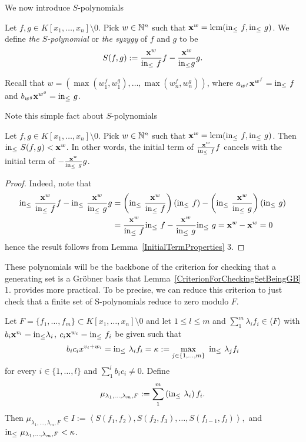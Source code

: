 We now introduce $S$-polynomials
\begin{definition}
    Let $f,g\in K[x_1,\dots,x_n]\setminus 0$. Pick $w\in \mathbb{N}^n$ such that $\mathbf{x}^w = \mathrm{lcm}(\mathrm{in}_\leq\ f,\mathrm{in}_\leq\ g)$. We define \textit{the $S$-polynomial} or \textit{the syzygy} of $f$ and $g$ to be 
    $$S(f,g):= \frac{\mathbf{x}^w}{\mathrm{in}_\leq\ f }f-\frac{\mathbf{x}^w}{\mathrm{in}_\leq 
 g }g.$$
\end{definition}
\begin{remark}
    Recall that $w = \left(\max\left(w^f_1,w^g_1\right),\dots,\max\left(w^f_n,w^g_n\right) \right)$, where $a_{w^f}\mathbf{x}^{w^f} = \inn\ f$ and $b_{w^g}\mathbf{x}^{w^g}= \inn\ g$.
\end{remark}
Note this simple fact about $S$-polynomials
\begin{lemma}\label{LeadingTermsOfTermsInSPolynomialVanish}
    Let $f,g\in K[x_1,\dots,x_n]\setminus 0$. Pick $w\in \mathbb{N}^n$ such that $\mathbf{x}^w = \mathrm{lcm}(\mathrm{in}_\leq\ f,\mathrm{in}_\leq\ g)$. Then $\mathrm{in}_\leq\ S(f,g)< \mathbf{x}^w$. In other words, the initial term of $\frac{\mathbf{x}^w}{\mathrm{in}_\leq\ f}f$ cancels with the initial term of $-\frac{\mathbf{x}^w}{\mathrm{in}_\leq\ g}g$.
\end{lemma}
\begin{proof}
    Indeed, note that  
    \begin{align*} 
        \inn\ \frac{\mathbf{x}^w}{\inn\ f}f -\inn\ \frac{\mathbf{x}^w}{\inn\ g}g &= \left(\inn\ \frac{\mathbf{x}^w}{\inn\ f}\right)\left(\inn\ f\right) - \left(\inn\ \frac{\mathbf{x}^w}{\inn\ g}\right)\left(\inn\ g\right)\\ 
        &= \frac{\mathbf{x}^w}{\inn\ f}\inn\ f - \frac{\mathbf{x}^w}{\inn\ g}\inn\ g 
        = \mathbf{x}^w-\mathbf{x}^w= 0 
    \end{align*}
    hence the result follows from Lemma~\ref{InitialTermProperties} 3.
\end{proof}
These polynomials will be the backbone of the criterion for checking that a generating set is a Gröbner basis that Lemma~\ref{CriterionForCheckingSetBeingGB} 1. provides more practical. To be precise, we can reduce this criterion to just check that a finite set of S-polynomials reduce to zero modulo $F$.
\begin{lemma}\label{TechnicalLemmaForBuchbergerCriterion}
    Let $F=\{f_1,\dots,f_m\}\subset K[x_1,\dots,x_n]\setminus 0$ and let $1\leq l \leq m$ and $\sum_1^m\lambda_if_i \in \langle F\rangle$ with 
    $b_{i}\mathbf{x}^{v_i}=\mathrm{in}_\leq \lambda_i$, $c_{i} \mathbf{x}^{w_i}=\mathrm{in}_\leq\ f_i$ be given such that $$b_ic_ix^{v_i+w_i}=\mathrm{in}_\leq \ \lambda_if_i =\kappa := \max_{j\in\{1,\dots,m\}}\ \mathrm{in}_\leq\ \lambda_jf_i$$
    for every $i\in\{1,\dots,l\}$ and $\sum_1^l b_ic_i \neq 0$. Define $$\mu_{\lambda_1,\dots,\lambda_m,F} := \sum_1^m \left(\mathrm{in}_\leq\ \lambda_i\right)f_i.$$
    Then $\mu_{\lambda_1,\dots,\lambda_m,F} \in I:=\left\langle S(f_1,f_2),S(f_2,f_3),\dots,S(f_{l-1},f_l)\right\rangle,$ and $\mathrm{in}_\leq\ \mu_{\lambda_1,\dots,\lambda_m,F} < \kappa$. 
\end{lemma}
